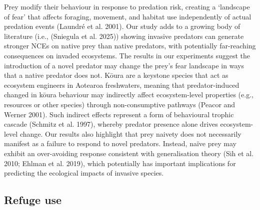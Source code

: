 \documentclass[
  12pt,
  a4paper,
  oneside]{scrbook}
\begin{document}
Prey modify their behaviour in response to predation risk, creating a
`landscape of fear' that affects foraging, movement, and habitat use
independently of actual predation events (Laundré et al. 2001). Our
study adds to a growing body of literature (i.e., (Sniegula et al.
2025)) showing invasive predators can generate stronger NCEs on native
prey than native predators, with potentially far-reaching consequences
on invaded ecosystems. The results in our experiments suggest the
introduction of a novel predator may change the prey's fear landscape in
ways that a native predator does not. Kōura are a keystone species that
act as ecosystem engineers in Aotearoa freshwaters, meaning that
predator-induced changed in kōura behaviour may indirectly affect
ecosystem-level properties (e.g., resources or other species) through
non-consumptive pathways (Peacor and Werner 2001). Such indirect effects
represent a form of behavioural trophic cascade (Schmitz et al. 1997),
whereby predator presence alone drives ecosystem-level change. Our
results also highlight that prey naivety does not necessarily manifest
as a failure to respond to novel predators. Instead, naïve prey may
exhibit an over-avoiding response consistent with generalisation theory
(Sih et al. 2010; Ehlman et al. 2019), which potentially has important
implications for predicting the ecological impacts of invasive species.

\subsection{Refuge use}\label{refuge-use}
\end{document}
